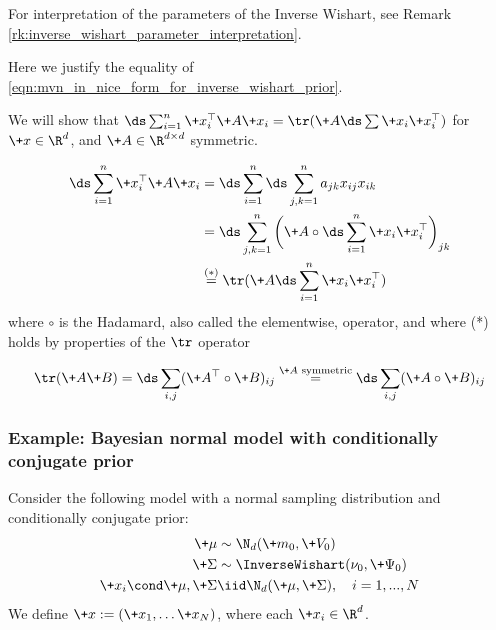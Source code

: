 \documentclass{article} %
\begin{document}
For interpretation of the parameters of the Inverse Wishart,  see Remark \ref{rk:inverse_wishart_parameter_interpretation}.

\begin{remark}{} 
\label{rk:reexpressing_mvn_in_nice_form_for_inverse_wishart_prior}

Here we justify the equality of \eqref{eqn:mvn_in_nice_form_for_inverse_wishart_prior}.

We will show that $\ds\sum_{i=1}^n \+x_i^\top \+A \+x_i = \tr(\+A \ds\sum \+x_i \+x_i^\top)$ for $\+x \in \R^d$,  and $\+A \in \R^{d \times d}$ symmetric.

\begin{align*}
\ds\sum_{i=1}^n \+x_i^\top \+A \+x_i  &= \ds\sum_{i=1}^n \ds\sum_{j,k=1}^n a_{jk} x_{ij} x_{ik} \\
& = \ds\sum_{j,k=1}^n \bigg( \+A \circ \ds\sum_{i=1}^n \+x_i \+x_i^\top \bigg)_{jk} \\
& \stackrel{(*)}{=} \tr (\+A \ds\sum_{i=1}^n \+x_i \+x_i^\top) 
\end{align*}
where $\circ$ is the Hadamard,  also called the elementwise,  operator,  and where (*) holds by properties of the $\tr$ operator

\[ \tr(\+A\+B) = \ds\sum_{i,j} (\+A^\top \circ \+B)_{ij}  \stackrel{\text{$\+A$ symmetric}}{=}  \ds\sum_{i,j} (\+A \circ \+B)_{ij}\]

\end{remark}

\subsubsection{Example:  Bayesian normal model with conditionally conjugate prior} \label{sec:normal_data_with_non_conjugate_prior}

Consider the following model with a normal sampling distribution and conditionally conjugate prior:
\begin{align*}
\+\mu &\sim \N_{d}(\+m_0,\+V_0 ) \\
\+\Sigma &\sim \InverseWishart(\nu_0,  \+\Psi_0) \\
\+x_i \cond \+\mu,  \+\Sigma &\iid \N_{d}( \+\mu , \+\Sigma), \quad i=1,...,N
\end{align*}
We define $\+x := (\+x_1,  \hdots \+x_N)$,  where each $\+x_i \in \R^d$.
\end{document}
